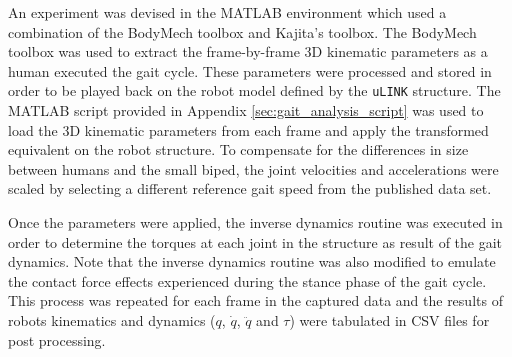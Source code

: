 An experiment was devised in the MATLAB environment which used a combination of the BodyMech toolbox and Kajita's toolbox. The BodyMech toolbox was used to extract the frame-by-frame 3D kinematic parameters as a human executed the gait cycle. These parameters were processed and stored in order to be played back on the robot model defined by the \texttt{uLINK} structure. The MATLAB script provided in Appendix \ref{sec:gait_analysis_script} was used to load the 3D kinematic parameters from each frame and apply the transformed equivalent on the robot structure. To compensate for the differences in size between humans and the small biped, the joint velocities and accelerations were scaled by selecting a different reference gait speed from the published data set. 
	
Once the parameters were applied, the inverse dynamics routine was executed in order to determine the torques at each joint in the structure as result of the gait dynamics. Note that the inverse dynamics routine was also modified to emulate the contact force effects experienced during the stance phase of the gait cycle. This process was repeated for each frame in the captured data and the results of robots kinematics and dynamics ($q$, $\dot{q}$, $\ddot{q}$ and $\tau$) were tabulated in CSV files for post processing. 
	
